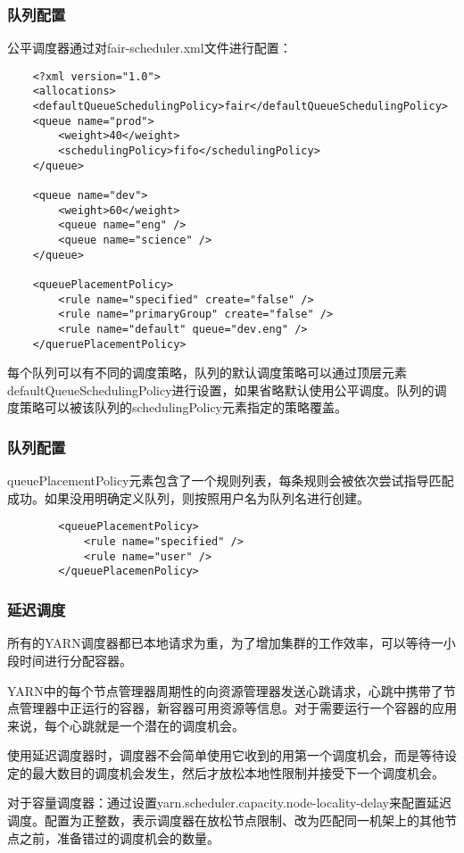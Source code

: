 \documentclass[a4paper]{article}
\begin{document}
	\subsubsection{队列配置}
	公平调度器通过对fair-scheduler.xml文件进行配置：
	\begin{lstlisting}
	<?xml version="1.0">
	<allocations>
	<defaultQueueSchedulingPolicy>fair</defaultQueueSchedulingPolicy>
	<queue name="prod">
		<weight>40</weight>
		<schedulingPolicy>fifo</schedulingPolicy>
	</queue>
	
	<queue name="dev">
		<weight>60</weight>
		<queue name="eng" />
		<queue name="science" />
	</queue>
	
	<queuePlacementPolicy>
		<rule name="specified" create="false" />
		<rule name="primaryGroup" create="false" />
		<rule name="default" queue="dev.eng" />
	</queruePlacementPolicy>
	\end{lstlisting}
	每个队列可以有不同的调度策略，队列的默认调度策略可以通过顶层元素defaultQueueSchedulingPolicy进行设置，如果省略默认使用公平调度。队列的调度策略可以被该队列的schedulingPolicy元素指定的策略覆盖。
	
	\subsubsection{队列配置}
	queuePlacementPolicy元素包含了一个规则列表，每条规则会被依次尝试指导匹配成功。如果没用明确定义队列，则按照用户名为队列名进行创建。
	\begin{lstlisting}
		<queuePlacementPolicy>
			<rule name="specified" />
			<rule name="user" />
		</queuePlacemenPolicy>
	\end{lstlisting}
	
	\subsubsection{延迟调度}
	所有的YARN调度器都已本地请求为重，为了增加集群的工作效率，可以等待一小段时间进行分配容器。
	
	YARN中的每个节点管理器周期性的向资源管理器发送心跳请求，心跳中携带了节点管理器中正运行的容器，新容器可用资源等信息。对于需要运行一个容器的应用来说，每个心跳就是一个潜在的调度机会。
	
	使用延迟调度器时，调度器不会简单使用它收到的用第一个调度机会，而是等待设定的最大数目的调度机会发生，然后才放松本地性限制并接受下一个调度机会。
	
	对于容量调度器：通过设置yarn.scheduler.capacity.node-locality-delay来配置延迟调度。配置为正整数，表示调度器在放松节点限制、改为匹配同一机架上的其他节点之前，准备错过的调度机会的数量。
	
\end{document}
